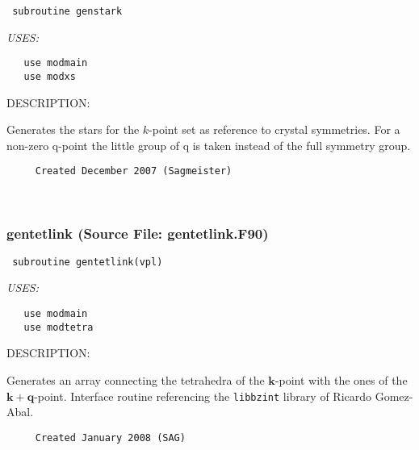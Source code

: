 \documentclass[11pt]{article}
\begin{document}
\begin{verbatim} subroutine genstark\end{verbatim}{\em USES:}
\begin{verbatim}   use modmain
   use modxs\end{verbatim}
{\sf DESCRIPTION:\\ }


     Generates the stars for the $k$-point set as reference to crystal
     symmetries. For a non-zero q-point the little group of q is taken
     instead of the full symmetry group.
  
\begin{verbatim}     Created December 2007 (Sagmeister)\end{verbatim}






 
 
\mbox{}\hrulefill\ 
 
\subsubsection{gentetlink (Source File: gentetlink.F90)}


\begin{verbatim} subroutine gentetlink(vpl)\end{verbatim}{\em USES:}
\begin{verbatim}   use modmain
   use modtetra\end{verbatim}
{\sf DESCRIPTION:\\ }


     Generates an array connecting the tetrahedra of the $\mathbf{k}$-point with
     the ones of the  $\mathbf{k}+\mathbf{q}$-point. Interface routine
     referencing the {\tt libbzint} library of Ricardo Gomez-Abal.
  
\begin{verbatim}     Created January 2008 (SAG)\end{verbatim}

\end{document}
